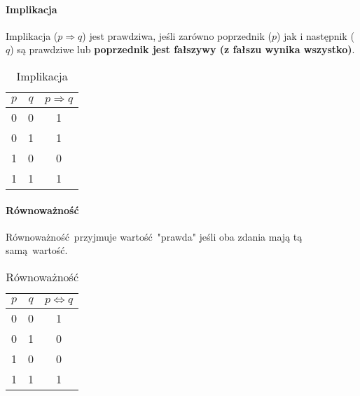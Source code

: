\documentclass{article}
\begin{document}
    \paragraph{Implikacja}
    Implikacja ($p \Longrightarrow q$) jest prawdziwa, jeśli zarówno poprzednik ($p$) jak i następnik ($q$) są prawdziwe lub \textbf{poprzednik jest fałszywy (z fałszu wynika wszystko)}.
    \begin{table}[h!]
        \begin{center}
            \caption{Implikacja}
            \label{tab:tabela4}
            \begin{tabular}{c|c|c}
                \textbf{$p$} & \textbf{$q$} & \textbf{$p \Longrightarrow q$} \\
                \midrule
                0 & 0 & 1\\
                0 & 1 & 1\\
                1 & 0 & 0\\
                1 & 1 & 1\\
                \bottomrule
            \end{tabular}
        \end{center}
    \end{table}
    \paragraph{Równoważność}
    Równoważność przyjmuje wartość "prawda" jeśli oba zdania mają tą samą wartość.
    \begin{table}[h!]
        \begin{center}
            \caption{Równoważność}
            \label{tab:tabela5}
            \begin{tabular}{c|c|c}
                \textbf{$p$} & \textbf{$q$} & \textbf{$p \Leftrightarrow q$} \\
                \midrule
                0 & 0 & 1\\
                0 & 1 & 0\\
                1 & 0 & 0\\
                1 & 1 & 1\\
                \bottomrule
            \end{tabular}
        \end{center}
    \end{table}
\end{document}
